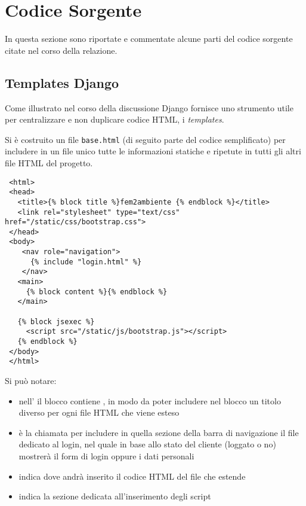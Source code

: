 \chapter{Codice Sorgente}
\label{app:codice}

In questa sezione sono riportate e commentate alcune parti del codice sorgente citate nel corso della relazione.

\section*{Templates Django}
\label{app:templates}

Come illustrato nel corso della discussione Django fornisce uno strumento utile per centralizzare e non duplicare codice HTML, i \emph{templates}.

Si è costruito un file \texttt{base.html} (di seguito parte del codice semplificato) per includere in un file unico tutte le informazioni statiche e ripetute in tutti gli altri file HTML del progetto.

\begin{footnotesize}
\begin{verbatim}
 <html>
 <head>
   <title>{% block title %}fem2ambiente {% endblock %}</title>
   <link rel="stylesheet" type="text/css" href="/static/css/bootstrap.css">
 </head>
 <body>
    <nav role="navigation">                        
      {% include "login.html" %}
    </nav>   
   <main>
     {% block content %}{% endblock %}
   </main>

   {% block jsexec %}
     <script src="/static/js/bootstrap.js"></script>
   {% endblock %}
 </body>
 </html>
\end{verbatim}
\end{footnotesize}

Si può notare:
\begin{itemize}
 \item nell' il blocco  contiene , in modo da poter includere nel blocco un titolo diverso per ogni file HTML che viene esteso
 \item {} è la chiamata per includere in quella sezione della barra di navigazione il file dedicato al login, nel quale in base allo stato del cliente (loggato o no) mostrerà il form di login oppure i dati personali
 \item {} indica dove andrà inserito il codice HTML del file che estende
 \item {} indica la sezione dedicata all'inserimento degli script {\js}
\end{itemize}

